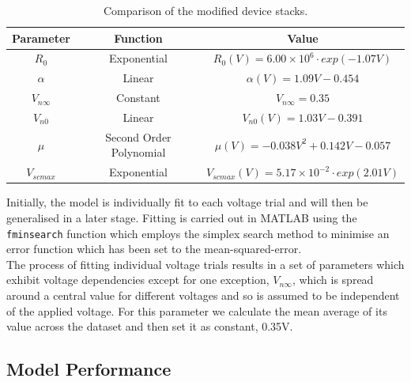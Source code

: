 \begin{table}[ht]
    \caption{Comparison of the modified device stacks.}
    \centering
    \begin{tabular}{|c|c|c|}
    \hline
    Parameter   & Function                & Value                                      \\ \hline
    $R_0$       & Exponential             & $R_0(V) = 6.00 \times 10^6 \cdot exp(-1.07V)$         \\ \hline
    $\alpha$    & Linear                  & $\alpha(V) = 1.09V -0.454$                 \\ \hline
    $V_{n\infty}$ & Constant                & $V_{n\infty} = 0.35$                         \\ \hline
    $V_{n0}$    & Linear                  & $V_{n0}(V) = 1.03V - 0.391 $               \\ \hline
    $\mu$       & Second Order Polynomial & $\mu(V) = -0.038V^2 + 0.142V - 0.057$      \\ \hline
    $V_{scmax}$ & Exponential             & $V_{scmax}(V) = 5.17 \times 10^{-2} \cdot exp(2.01V)$ \\ \hline
    \end{tabular}
    \label{table:5b}
\end{table}

\noindent Initially, the model is individually fit to each voltage trial and will then be generalised in a later stage. Fitting is carried out in MATLAB using the \texttt{fminsearch} function which employs the simplex search method \cite{lagarias1998convergence} to minimise an error function which has been set to the mean-squared-error. \\

\noindent The process of fitting individual voltage trials results in a set of parameters which exhibit voltage dependencies except for one exception, $V_{n\infty}$, which is spread around a central value for different voltages and so is assumed to be independent of the applied voltage. For this parameter we calculate the mean average of its value across the dataset and then set it as constant, 0.35V.


\subsection[Model Performance]{Model Performance}

